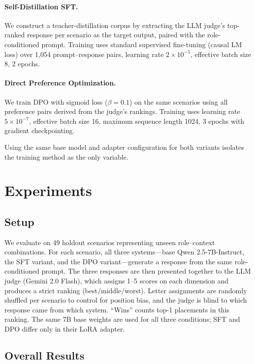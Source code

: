 \documentclass{article}
\begin{document}
\paragraph{Self-Distillation SFT.} We construct a teacher-distillation corpus by extracting the LLM judge's top-ranked response per scenario as the target output, paired with the role-conditioned prompt. Training uses standard supervised fine-tuning (causal LM loss) over 1,054 prompt--response pairs, learning rate $2 \times 10^{-5}$, effective batch size 8, 2 epochs.

\paragraph{Direct Preference Optimization.} We train DPO with sigmoid loss ($\beta = 0.1$) on the same scenarios using all preference pairs derived from the judge's rankings. Training uses learning rate $5 \times 10^{-7}$, effective batch size 16, maximum sequence length 1024, 3 epochs with gradient checkpointing.

Using the same base model and adapter configuration for both variants isolates the training method as the only variable.


\section{Experiments}

\subsection{Setup}

We evaluate on 49 holdout scenarios representing unseen role--context combinations. For each scenario, all three systems---base Qwen 2.5-7B-Instruct, the SFT variant, and the DPO variant---generate a response from the same role-conditioned prompt. The three responses are then presented together to the LLM judge (Gemini 2.0 Flash), which assigns 1--5 scores on each dimension and produces a strict ranking (best/middle/worst). Letter assignments are randomly shuffled per scenario to control for position bias, and the judge is blind to which response came from which system. ``Wins'' counts top-1 placements in this ranking. The same 7B base weights are used for all three conditions; SFT and DPO differ only in their LoRA adapter.

\subsection{Overall Results}
\end{document}

